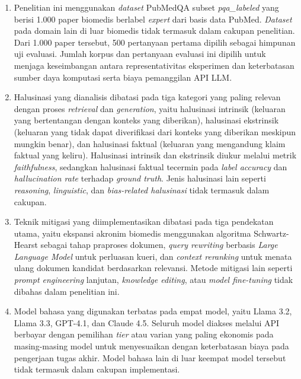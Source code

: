 \begin{enumerate}
    \item Penelitian ini menggunakan \textit{dataset}
          PubMedQA subset \textit{pqa\_labeled} yang berisi 1.000 paper
          biomedis berlabel \textit{expert} dari basis data PubMed.
          \textit{Dataset} pada domain lain di luar biomedis tidak
          termasuk dalam cakupan penelitian. Dari 1.000 paper
          tersebut, 500 pertanyaan pertama dipilih sebagai himpunan uji
          evaluasi. Jumlah korpus dan pertanyaan evaluasi ini dipilih
          untuk menjaga keseimbangan antara representativitas eksperimen
          dan keterbatasan sumber daya komputasi serta biaya pemanggilan
          API LLM.

    \item Halusinasi yang dianalisis dibatasi
          pada tiga kategori yang paling relevan dengan proses
          \textit{retrieval} dan \textit{generation}, yaitu halusinasi
          intrinsik (keluaran yang bertentangan dengan konteks yang
          diberikan), halusinasi ekstrinsik (keluaran yang tidak dapat
          diverifikasi dari konteks yang diberikan meskipun mungkin
          benar), dan halusinasi faktual (keluaran yang mengandung
          klaim faktual yang keliru). Halusinasi intrinsik dan
          ekstrinsik diukur melalui metrik \textit{faithfulness},
          sedangkan halusinasi faktual tecermin pada \textit{label
          accuracy} dan \textit{hallucination rate} terhadap
          \textit{ground truth}. Jenis halusinasi
          lain seperti \textit{reasoning}, \textit{linguistic}, dan
          \textit{bias-related halusinasi} tidak termasuk dalam
          cakupan.

    \item Teknik mitigasi yang diimplementasikan
          dibatasi pada tiga pendekatan utama, yaitu ekspansi akronim
          biomedis menggunakan algoritma Schwartz-Hearst sebagai tahap
          praproses dokumen, \textit{query rewriting} berbasis
          \textit{Large Language Model} untuk perluasan kueri, dan
          \textit{context reranking} untuk menata ulang dokumen kandidat
          berdasarkan relevansi. Metode mitigasi lain seperti
          \textit{prompt engineering} lanjutan, \textit{knowledge
          editing}, atau \textit{model fine-tuning} tidak dibahas dalam
          penelitian ini.

    \item Model bahasa yang digunakan terbatas
          pada empat model, yaitu Llama 3.2, Llama 3.3, GPT-4.1, dan
          Claude 4.5. Seluruh model diakses melalui API berbayar dengan
          pemilihan \textit{tier} atau varian yang paling ekonomis pada
          masing-masing model untuk menyesuaikan dengan keterbatasan
          biaya pada pengerjaan tugas akhir. Model bahasa lain di luar
          keempat model tersebut tidak termasuk dalam cakupan
          implementasi.


\end{enumerate}
